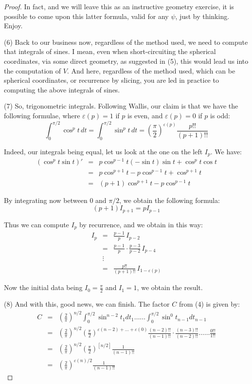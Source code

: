 \documentclass[10pt,a4paper]{amsart}
\begin{document}
\begin{proof}
In fact, and we will leave this as an instructive geometry exercise, it is possible to come upon this latter formula, valid for any $\psi$, just by thinking. Enjoy.

\medskip

(6) Back to our business now, regardless of the method used, we need to compute that integrals of sines. I mean, even when short-circuiting the spherical coordinates, via some direct geometry, as suggested in (5), this would lead us into the computation of $V$. And here, regardless of the method used, which can be spherical coordinates, or recurrence by slicing, you are led in practice to computing the above integrals of sines. 

\medskip

(7) So, trigonometric integrals. Following Wallis, our claim is that we have the following formulae, where $\varepsilon(p)=1$ if $p$ is even, and $\varepsilon(p)=0$ if $p$ is odd:
$$\int_0^{\pi/2}\cos^pt\,dt=\int_0^{\pi/2}\sin^pt\,dt=\left(\frac{\pi}{2}\right)^{\varepsilon(p)}\frac{p!!}{(p+1)!!}$$

Indeed, our integrals being equal, let us look at the one on the left $I_p$. We have:
\begin{eqnarray*}
(\cos^pt\sin t)'
&=&p\cos^{p-1}t(-\sin t)\sin t+\cos^pt\cos t\\
&=&p\cos^{p+1}t-p\cos^{p-1}t+\cos^{p+1}t\\
&=&(p+1)\cos^{p+1}t-p\cos^{p-1}t
\end{eqnarray*}

By integrating now between $0$ and $\pi/2$, we obtain the following formula:
$$(p+1)I_{p+1}=pI_{p-1}$$

Thus we can compute $I_p$ by recurrence, and we obtain in this way:
\begin{eqnarray*}
I_p
&=&\frac{p-1}{p}\,I_{p-2}\\
&=&\frac{p-1}{p}\cdot\frac{p-3}{p-2}\,I_{p-4}\\
&\vdots&\\
&=&\frac{p!!}{(p+1)!!}\,I_{1-\varepsilon(p)}
\end{eqnarray*}

Now the initial data being $I_0=\frac{\pi}{2}$ and $I_1=1$, we obtain the result.

\medskip

(8) And with this, good news, we can finish. The factor $C$ from (4) is given by:
\begin{eqnarray*}
C
&=&\left(\frac{2}{\pi}\right)^{n/2}\int_0^{\pi/2}\sin^{n-2}t_1dt_1\ldots\ldots\int_0^{\pi/2}\sin^0t_{n-1}dt_{n-1}\\
&=&\left(\frac{2}{\pi}\right)^{n/2}\left(\frac{\pi}{2}\right)^{\varepsilon(n-2)+\ldots+\varepsilon(0)}\frac{(n-2)!!}{(n-1)!!}\cdot\frac{(n-3)!!}{(n-2)!!}\ldots\ldots\frac{0!!}{1!!}\\
&=&\left(\frac{2}{\pi}\right)^{n/2}\left(\frac{\pi}{2}\right)^{[n/2]}\frac{1}{(n-1)!!}\\
&=&\left(\frac{2}{\pi}\right)^{\varepsilon(n)/2}\frac{1}{(n-1)!!}
\end{eqnarray*}


\end{proof}
\end{document}
